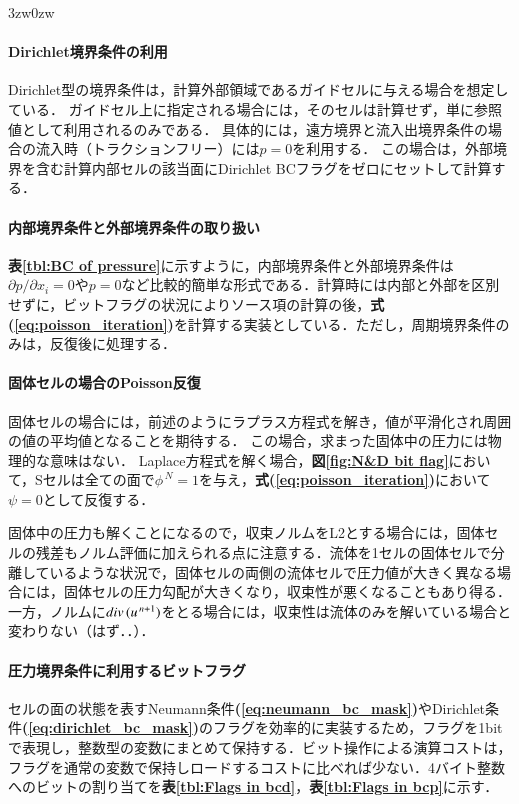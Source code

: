 \begin{indentation}{3zw}{0zw}
%
\paragraph{Dirichlet境界条件の利用}
Dirichlet型の境界条件は，計算外部領域であるガイドセルに与える場合を想定している．
ガイドセル上に指定される場合には，そのセルは計算せず，単に参照値として利用されるのみである．
具体的には，遠方境界と流入出境界条件の場合の流入時（トラクションフリー）には$p=0$を利用する．
この場合は，外部境界を含む計算内部セルの該当面にDirichlet BCフラグをゼロにセットして計算する．

%
\paragraph{内部境界条件と外部境界条件の取り扱い}
\textbf{表\ref{tbl:BC of pressure}}に示すように，内部境界条件と外部境界条件は$\partial p/\partial x_i = 0$や$p=0$など比較的簡単な形式である．計算時には内部と外部を区別せずに，ビットフラグの状況によりソース項の計算の後，\textbf{式(\ref{eq:poisson_iteration})}を計算する実装としている．ただし，周期境界条件のみは，反復後に処理する．

%
\paragraph{固体セルの場合のPoisson反復}
固体セルの場合には，前述のようにラプラス方程式を解き，値が平滑化され周囲の値の平均値となることを期待する．
この場合，求まった固体中の圧力には物理的な意味はない．
Laplace方程式を解く場合，\textbf{図\ref{fig:N&D bit flag}}において，Sセルは全ての面で$\phi^{\,N}=1$を与え，\textbf{式(\ref{eq:poisson_iteration})}において$\psi=0$として反復する．

固体中の圧力も解くことになるので，収束ノルムをL2とする場合には，固体セルの残差もノルム評価に加えられる点に注意する．流体を1セルの固体セルで分離しているような状況で，固体セルの両側の流体セルで圧力値が大きく異なる場合には，固体セルの圧力勾配が大きくなり，収束性が悪くなることもあり得る．一方，ノルムに$div\,(\boldmath{u}^{\,n+1})$をとる場合には，収束性は流体のみを解いている場合と変わりない（はず．．）．

%
\paragraph{圧力境界条件に利用するビットフラグ}
セルの面の状態を表すNeumann条件\textbf{(\ref{eq:neumann_bc_mask})}やDirichlet条件\textbf{(\ref{eq:dirichlet_bc_mask})}のフラグを効率的に実装するため，フラグを1bitで表現し，整数型の変数にまとめて保持する．ビット操作による演算コストは，フラグを通常の変数で保持しロードするコストに比べれば少ない．4バイト整数へのビットの割り当てを\textbf{表\ref{tbl:Flags in bcd}}，\textbf{表\ref{tbl:Flags in bcp}}に示す．


\end{indentation}
